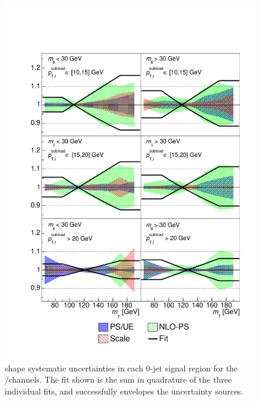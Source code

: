 \begin{figure}[p]
	\includegraphics[width=\hugefigwidth]{custom_images/mT-shapes/ww_df_0j}
	\caption{\WW \mt shape systematic uncertainties in each 0-jet signal region for the 
	\emch/\mech channels. The fit shown is the sum in quadrature of the three individual 
	fits, and successfully envelopes the uncertainty sources.}
	\label{fig:ww_bkg:mTshape_0j}
\end{figure}

